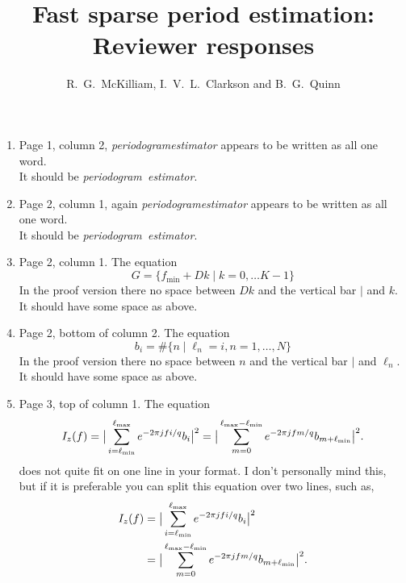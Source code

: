 \documentclass[a4paper,10pt]{article}
\title{Fast sparse period estimation: Reviewer responses}
\author{R.~G.~McKilliam, I.~V.~L.~Clarkson and B.~G.~Quinn 
}
\begin{document}

\begin{enumerate}

\item Page 1, column 2, \emph{periodogramestimator} appears to be written as all one word.  \\ It should be \emph{periodogram~estimator}.

\item Page 2, column 1, again \emph{periodogramestimator} appears to be written as all one word.  \\ It should be \emph{periodogram~estimator}.

\item Page 2, column 1.  The equation
\[
G = \{ f_{\text{min}} + Dk \mid k = 0, \dots K-1 \}
\]
In the proof version there no space between $Dk$ and the vertical bar $\vert$ and $k$.  It should have some space as above.

\item Page 2, bottom of column 2.  The equation
\[
b_i = \#\{ n \mid \ell_n = i, n = 1,\dots, N\}
\]
In the proof version there no space between $n$ and the vertical bar $\vert$ and $\ell_n$.  It should have some space as above.

\newcommand{\ellmin}{\ell_{\text{min}}}
\newcommand{\ellmax}{\ell_{\text{max}}}


\item Page 3, top of column 1.  The equation
\[
I_z(f) = \babs{ \sum_{i = \ellmin}^{\ellmax} e^{ -2\pi j f i/q} b_i }^2 = \babs{ \sum_{m = 0}^{\ellmax-\ellmin} e^{ -2\pi j f m/q} b_{m+\ellmin} }^2.
\]
does not quite fit on one line in your format.  I don't personally mind this, but if it is preferable you can split this equation over two lines, such as,
\begin{align*}
I_z(f) &= \babs{ \sum_{i = \ellmin}^{\ellmax} e^{ -2\pi j f i/q} b_i }^2 \\
&= \babs{ \sum_{m = 0}^{\ellmax-\ellmin} e^{ -2\pi j f m/q} b_{m+\ellmin} }^2.
\end{align*}


\end{enumerate}
\end{document}
